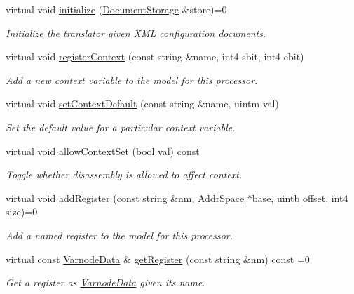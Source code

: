 \begin{DoxyCompactItemize}
virtual void \mbox{\hyperlink{class_translate_af8e71e9a9477e9a91be400ecca565df5}{initialize}} (\mbox{\hyperlink{class_document_storage}{Document\+Storage}} \&store)=0
\begin{DoxyCompactList}\small\item\em Initialize the translator given X\+ML configuration documents. \end{DoxyCompactList}\item 
virtual void \mbox{\hyperlink{class_translate_ab389d99d7a2d0c4bdc03c7c1b2362c25}{register\+Context}} (const string \&name, int4 sbit, int4 ebit)
\begin{DoxyCompactList}\small\item\em Add a new context variable to the model for this processor. \end{DoxyCompactList}\item 
virtual void \mbox{\hyperlink{class_translate_ab608abbfb7f8a0ad21fed57dc00c0439}{set\+Context\+Default}} (const string \&name, uintm val)
\begin{DoxyCompactList}\small\item\em Set the default value for a particular context variable. \end{DoxyCompactList}\item 
virtual void \mbox{\hyperlink{class_translate_ae74cac44825c3979c65c105bc66cd63c}{allow\+Context\+Set}} (bool val) const
\begin{DoxyCompactList}\small\item\em Toggle whether disassembly is allowed to affect context. \end{DoxyCompactList}\item 
virtual void \mbox{\hyperlink{class_translate_a2614aefa5c03a9f1ed0b2dba794cad2c}{add\+Register}} (const string \&nm, \mbox{\hyperlink{class_addr_space}{Addr\+Space}} $\ast$base, \mbox{\hyperlink{types_8h_a2db313c5d32a12b01d26ac9b3bca178f}{uintb}} offset, int4 size)=0
\begin{DoxyCompactList}\small\item\em Add a named register to the model for this processor. \end{DoxyCompactList}\item 
virtual const \mbox{\hyperlink{struct_varnode_data}{Varnode\+Data}} \& \mbox{\hyperlink{class_translate_a3a62c460db4eccc285fa3dd29dd4a29b}{get\+Register}} (const string \&nm) const =0
\begin{DoxyCompactList}\small\item\em Get a register as \mbox{\hyperlink{struct_varnode_data}{Varnode\+Data}} given its name. \end{DoxyCompactList}\item 

\end{DoxyCompactItemize}
